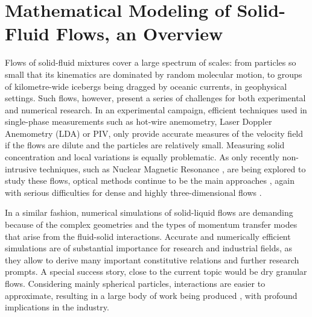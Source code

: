 \section{Mathematical Modeling of Solid-Fluid Flows, an Overview}
\label{sec:int_motivation}

Flows of solid-fluid mixtures cover a large spectrum of scales: from particles so small that its kinematics are dominated by random molecular motion, to groups of kilometre-wide icebergs being dragged by oceanic currents, in geophysical settings. Such flows, however, present a series of challenges for both experimental and numerical research. In an experimental campaign, efficient techniques used in single-phase measurements such as hot-wire anemometry, Laser Doppler Anemometry (LDA) or \ac{PIV}, only provide accurate measures of the velocity field if the flows are dilute and the particles are relatively small. Measuring solid concentration and local variations is equally problematic. As only recently non-intrusive techniques, such as Nuclear Magnetic Resonance \citep{Fukushima-1999, Lemonnier-2010}, are being explored to study these flows, optical methods continue to be the main approaches \citep{Douxchamps-2002, Armanini-2008}, again with serious difficulties for dense and highly three-dimensional flows \citep{Spinewine-2003}. 

In a similar fashion, numerical simulations of solid-liquid flows are demanding because of the complex geometries and the types of momentum transfer modes that arise from the fluid-solid interactions. %
Accurate and numerically efficient simulations are of substantial importance for research and industrial fields, as they allow to derive many important constitutive relations and further research prompts. A special success story, close to the current topic would be dry granular flows. Considering mainly spherical particles, interactions are easier to approximate, resulting in a large body of work being produced \citep{Campbell-2006}, with profound implications in the industry.

